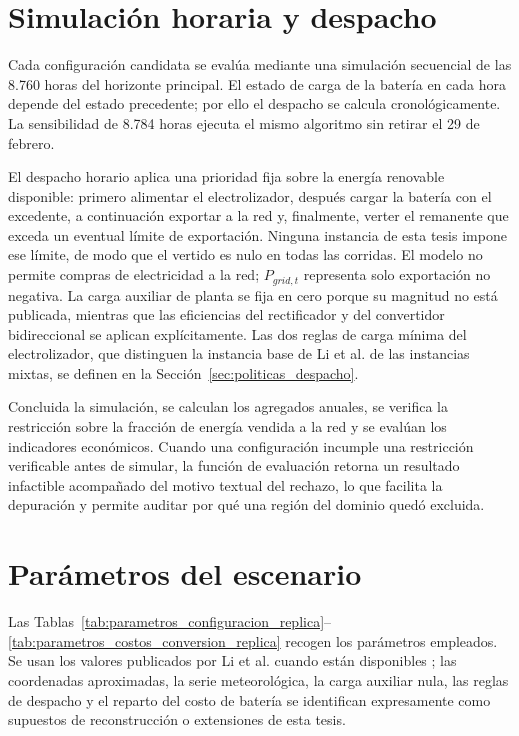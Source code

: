\section{Simulación horaria y despacho}

Cada configuración candidata se evalúa mediante una simulación secuencial de las 8.760 horas del horizonte principal. El estado de carga de la batería en cada hora depende del estado precedente; por ello el despacho se calcula cronológicamente. La sensibilidad de 8.784 horas ejecuta el mismo algoritmo sin retirar el 29 de febrero.

El despacho horario aplica una prioridad fija sobre la energía renovable disponible: primero alimentar el electrolizador, después cargar la batería con el excedente, a continuación exportar a la red y, finalmente, verter el remanente que exceda un eventual límite de exportación. Ninguna instancia de esta tesis impone ese límite, de modo que el vertido es nulo en todas las corridas. El modelo no permite compras de electricidad a la red; $P_{grid,t}$ representa solo exportación no negativa. La carga auxiliar de planta se fija en cero porque su magnitud no está publicada, mientras que las eficiencias del rectificador y del convertidor bidireccional se aplican explícitamente. Las dos reglas de carga mínima del electrolizador, que distinguen la instancia base de Li et al. de las instancias mixtas, se definen en la Sección~\ref{sec:politicas_despacho}.

Concluida la simulación, se calculan los agregados anuales, se verifica la restricción sobre la fracción de energía vendida a la red y se evalúan los indicadores económicos. Cuando una configuración incumple una restricción verificable antes de simular, la función de evaluación retorna un resultado infactible acompañado del motivo textual del rechazo, lo que facilita la depuración y permite auditar por qué una región del dominio quedó excluida.

\section{Parámetros del escenario}

Las Tablas~\ref{tab:parametros_configuracion_replica}--\ref{tab:parametros_costos_conversion_replica} recogen los parámetros empleados. Se usan los valores publicados por Li et al. cuando están disponibles \cite{Li2024WPEB}; las coordenadas aproximadas, la serie meteorológica, la carga auxiliar nula, las reglas de despacho y el reparto del costo de batería se identifican expresamente como supuestos de reconstrucción o extensiones de esta tesis.

